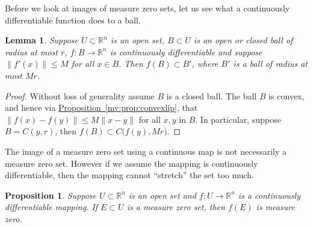 \documentclass[12pt]{book}
\newcommand{\snorm}[1]{\lVert {#1} \rVert}
\newcommand{\R}{{\mathbb{R}}}
\theoremstyle{plain}
\newtheorem{lemma}[thm]{Lemma}
\newtheorem{prop}[thm]{Proposition}
\theoremstyle{remark}
\theoremstyle{definition}
\theoremstyle{exercise}
\theoremstyle{example}
\newcommand{\propref}[1]{\hyperref[#1]{Proposition~\ref*{#1}}}
\begin{document}
Before we look at images of measure zero sets, let us see what a
continuously differentiable function does to a ball.

\begin{lemma} \label{lemma:ballmapder}
Suppose $U \subset \R^n$ is an open set,
$B \subset U$ is an open or closed ball of radius at most $r$, $f \colon B \to \R^n$ is continuously
differentiable and suppose $\snorm{f'(x)} \leq M$ for all $x \in B$.
Then $f(B) \subset B'$, where $B'$ is a ball of radius at most $Mr$.
\end{lemma}

\begin{proof}
Without loss of generality assume $B$ is a closed ball.
The ball $B$ is convex, and hence via
\propref{mv:prop:convexlip},
that $\snorm{f(x)-f(y)} \leq M \snorm{x-y}$
for all $x,y$ in $B$.  In particular, suppose $B = C(y,r)$,
then $f(B) \subset C\bigl(f(y),M r \bigr)$.
\end{proof}

The image of a measure zero set using a continuous map is not necessarily
a measure zero set.  However if we assume the mapping is continuously
differentiable, then the mapping cannot ``stretch'' the set too much.

\begin{prop} \label{prop:imagenull}
Suppose $U \subset \R^n$ is an open set and $f \colon U \to \R^n$
is a continuously differentiable mapping.  If $E \subset U$ is a 
measure zero set, then $f(E)$ is measure zero.
\end{prop}
\end{document}
